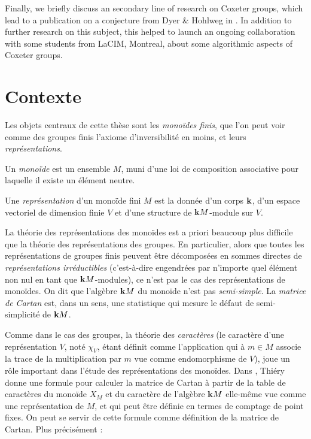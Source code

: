 \documentclass{article}
\begin{document}
	Finally, we briefly discuss an secondary line of research on Coxeter groups, which lead to a publication \cite{Baba2020} on a conjecture from Dyer \& Hohlweg in \cite{dyer2016small}. In addition to further research on this subject, this helped to launch an ongoing collaboration with some students from LaCIM, Montreal, about some algorithmic aspects of Coxeter groups.
	
	\newpage
	
	\section*{Contexte}
	
	Les objets centraux de cette thèse sont les \emph{monoïdes finis}, 
	que l'on peut voir comme des groupes finis l'axiome d'inversibilité 
	en moins, et leurs \emph{représentations}.
	
	\begin{dftn}
		Un \emph{monoïde} est un ensemble $M$, muni d'une loi de 
		composition associative pour laquelle il existe un élément neutre. 

		Une \emph{représentation} d'un monoïde fini $M$ est la donnée d'un
		corps $\mathbf{k}$, d'un espace vectoriel de dimension finie $V$ et d'une
		structure de $\mathbf{k} M$-module sur $V$.
	\end{dftn}
	
	La théorie des représentations des monoïdes est a priori beaucoup plus
	difficile que la théorie des représentations des groupes. En particulier, 
	alors que toutes les représentations de groupes finis peuvent être 
	décomposées en sommes directes de \emph{représentations irréductibles} 
	(c'est-à-dire engendrées par n'importe quel élément non nul en tant que 
	$\mathbf{k} M$-modules), ce n'est pas le cas des représentations de monoïdes. 
	On dit que l'algèbre $\mathbf{k} M$ du monoïde n'est pas \emph{semi-simple}. 
	La \emph{matrice de Cartan} est, dans un sens, une statistique qui 
	mesure le défaut de semi-simplicité de $\mathbf{k} M$.
	
	Comme dans le cas des groupes, la théorie des \emph{caractères} (le 
	caractère d'une représentation $V$, noté $\chi_V$, étant définit comme 
	l'application qui à $m \in M$ associe la trace de la multiplication par 
	$m$ vue comme endomorphisme de $V$), joue un rôle important dans l'étude 
	des représentations des monoïdes.
	Dans \cite{Thiery.CartanMatrixMonoid}, Thiéry donne une formule pour calculer 
	la matrice de Cartan à partir de la table de caractères du monoïde $X_M$ et 
	du caractère de l'algèbre $\mathbf{k} M$ elle-même vue comme une représentation de 
	$M$, et qui peut être définie en termes de comptage de point fixes. On peut 
	se servir de cette formule comme définition de la matrice de Cartan. Plus 
	précisément :
	
\end{document}
